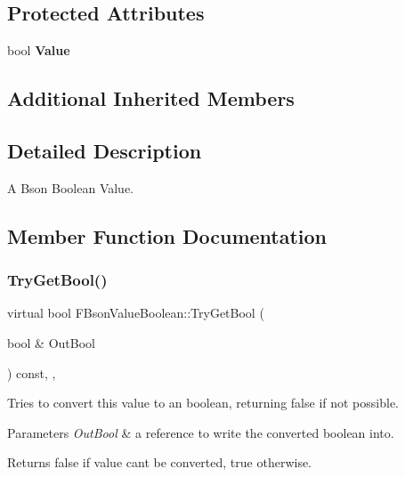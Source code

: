 \subsection*{Protected Attributes}
\begin{DoxyCompactItemize}
\item 
\mbox{\label{class_f_bson_value_boolean_ad15c81e2806941eb37091102f3d81cea}} 
bool {\bfseries Value}
\end{DoxyCompactItemize}
\subsection*{Additional Inherited Members}


\subsection{Detailed Description}
A Bson Boolean Value. 

\subsection{Member Function Documentation}
\mbox{\label{class_f_bson_value_boolean_a1999907437ed5dc5142f46919683c478}} 
\subsubsection{\texorpdfstring{Try\+Get\+Bool()}{TryGetBool()}}
{\footnotesize\ttfamily virtual bool F\+Bson\+Value\+Boolean\+::\+Try\+Get\+Bool (\begin{DoxyParamCaption}\item[{bool \&}]{Out\+Bool }\end{DoxyParamCaption}) const\hspace{0.3cm}{\ttfamily [inline]}, {\ttfamily [override]}, {\ttfamily [virtual]}}

Tries to convert this value to an boolean, returning false if not possible.


\begin{DoxyParams}{Parameters}
{\em Out\+Bool} & a reference to write the converted boolean into. \\
\hline
\end{DoxyParams}
\begin{DoxyReturn}{Returns}
false if value can\textquotesingle{}t be converted, true otherwise. 
\end{DoxyReturn}


